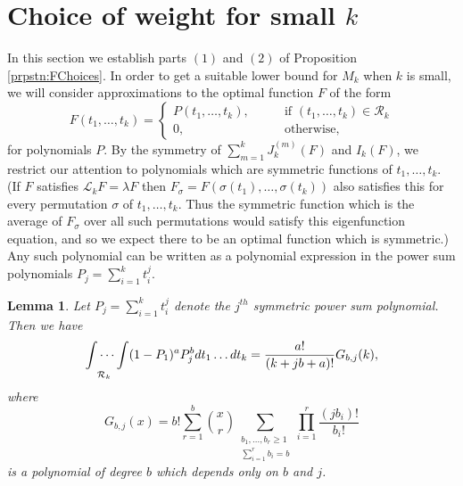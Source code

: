 \documentclass[12pt,a4paper]{amsart}
\theoremstyle{plain}
\newtheorem{lmm}[thrm]{Lemma}
\numberwithin{sblmm}{thrm}
\numberwithin{equation}{section}
\begin{document}
\section{\texorpdfstring{Choice of weight for small $k$}{Choice of weight for small k}}
In this section we establish parts $(1)$ and $(2)$ of Proposition \ref{prpstn:FChoices}. In order to get a suitable lower bound for $M_k$ when $k$ is small, we will consider approximations to the optimal function $F$ of the form
\begin{equation}
F(t_1,\dotsc,t_k)=\begin{cases}P(t_1,\dotsc,t_k),\qquad &\text{if }(t_1,\dotsc,t_k)\in\mathcal{R}_k\\0,&\text{otherwise,}\end{cases}\label{eq:FChoice}
\end{equation}for polynomials $P$. By the symmetry of $\sum_{m=1}^kJ_k^{(m)}(F)$ and $I_k(F)$, we restrict our attention to polynomials which are symmetric functions of $t_1,\dotsc,t_k$. (If $F$ satisfies $\mathcal{L}_kF=\lambda F$ then $F_\sigma=F(\sigma(t_1),\dots,\sigma(t_k))$ also satisfies this for every permutation $\sigma$ of $t_1,\dots,t_k$. Thus the symmetric function which is the average of $F_\sigma$ over all such permutations would satisfy this eigenfunction equation, and so we expect there to be an optimal function which is symmetric.) Any such polynomial can be written as a polynomial expression in the power sum polynomials $P_j=\sum_{i=1}^kt_i^j$.
\begin{lmm}\label{lmm:Integration}
Let $P_j=\sum_{i=1}^kt_i^j$ denote the $j^{th}$ symmetric power sum polynomial. Then we have
\[\idotsint\limits_{\mathcal{R}_k}(1-P_1)^aP_j^bdt_1\dotsc dt_k=\frac{a!}{(k+jb+a)!}G_{b,j}(k),\]
where
\[G_{b,j}(x)=b!\sum_{r=1}^b\binom{x}{r}\sum_{\substack{b_1,\dotsc,b_r\ge 1\\ \sum_{i=1}^rb_i=b}}\prod_{i=1}^r\frac{(jb_i)!}{b_i!}\]
is a polynomial of degree $b$ which depends only on $b$ and $j$.
\end{lmm}
\end{document}
